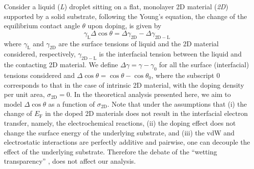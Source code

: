 \documentclass[journal=jacsat,manuscript=article,email=true]{achemso}
\begin{document}
Consider a liquid (\emph{L}) droplet sitting on a flat, monolayer 2D
material (\emph{2D}) supported by a solid substrate, following the Young’s
equation, the change of the equilibrium contact angle \(\theta\) upon
doping, is given by
\begin{equation}
\label{eqn-def-Young-Delta-theta}
\gamma_{\mathrm{L}} \Delta \cos\theta = \Delta \gamma_{\mathrm{2D}}
                                 - \Delta \gamma_{\mathrm{2D-L}}
\end{equation}
where \(\gamma_{\mathrm{L}}\) and \(\gamma_{\mathrm{2D}}\) are the surface
tensions of liquid and the 2D material considered,
respectively, \(\gamma_{\mathrm{2D-L}}\) is the interfacial tension between the
liquid and the contacting 2D material. We define \(\Delta \gamma =
\gamma - \gamma_{0}\) for all the surface (interfacial) tensions considered and
\(\Delta \cos \theta = \cos \theta - \cos \theta_{0}\), where the
subscript 0 corresponds to that in the case of intrinsic 2D material,
with the doping density per unit area, \(\sigma_{\mathrm{2D}} = 0\). In
the theoretical analysis presented here, we aim to model \(\Delta \cos
\theta\) as a function of \(\sigma_{\mathrm{2D}}\). Note that under the
assumptions that (i) the change of \(E_{\mathrm{F}}\) in the doped 2D
materials does not result in the interfacial electron transfer,
namely, the electrochemical reactions, (ii) the doping effect does not
change the surface energy of the underlying substrate, and (iii) the
vdW and electrostatic interactions are perfectly additive and
pairwise, one can decouple the effect of the underlying
substrate. Therefore the debate of the “wetting transparency”
\cite{rafiee_wetting_2012,shih_wetting_2013}, does not affect our analysis.
\end{document}
